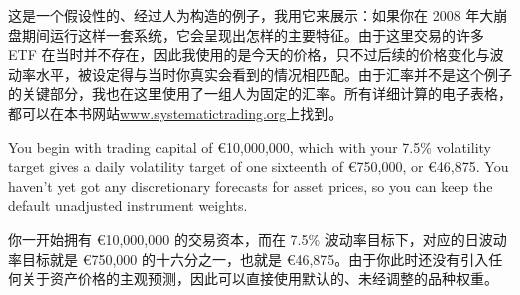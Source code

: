 \begin{chineseblock}这是一个假设性的、经过人为构造的例子，我用它来展示：如果你在 2008 年大崩盘期间运行这样一套系统，它会呈现出怎样的主要特征。由于这里交易的许多 ETF 在当时并不存在，因此我使用的是今天的价格，只不过后续的价格变化与波动率水平，被设定得与当时你真实会看到的情况相匹配。由于汇率并不是这个例子的关键部分，我也在这里使用了一组人为固定的汇率。所有详细计算的电子表格，都可以在本书网站\url{www.systematictrading.org}上找到。\end{chineseblock}


\begin{englishblock} You begin with trading capital of €10,000,000, which with your 7.5\% volatility target gives a daily volatility target of one sixteenth of €750,000, or €46,875. You haven't yet got any discretionary forecasts for asset prices, so you can keep the default unadjusted instrument weights. \end{englishblock}

\begin{chineseblock}你一开始拥有 €10,000,000 的交易资本，而在 7.5\% 波动率目标下，对应的日波动率目标就是 €750,000 的十六分之一，也就是 €46,875。由于你此时还没有引入任何关于资产价格的主观预测，因此可以直接使用默认的、未经调整的品种权重。\end{chineseblock}


